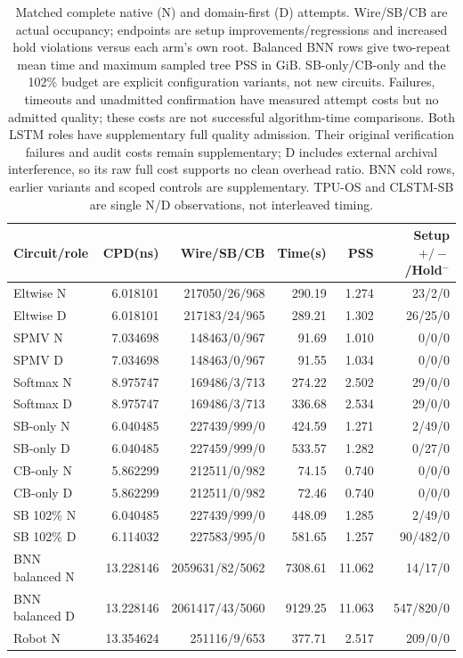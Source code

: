 \documentclass[conference,10pt]{IEEEtran}
\begin{document}
\begin{table}[t]
\centering\footnotesize\setlength{\tabcolsep}{3pt}
\caption{Matched complete native (N) and domain-first (D) attempts. Wire/SB/CB are actual occupancy; endpoints are setup improvements/regressions and increased hold violations versus each arm's own root. Balanced BNN rows give two-repeat mean time and maximum sampled tree PSS in GiB. SB-only/CB-only and the 102\% budget are explicit configuration variants, not new circuits. Failures, timeouts and unadmitted confirmation have measured attempt costs but no admitted quality; these costs are not successful algorithm-time comparisons. Both LSTM roles have supplementary full quality admission. Their original verification failures and audit costs remain supplementary; D includes external archival interference, so its raw full cost supports no clean overhead ratio. BNN cold rows, earlier variants and scoped controls are supplementary. TPU-OS and CLSTM-SB are single N/D observations, not interleaved timing.}
\label{tab:completecost}
\begin{tabular}{lrrrrr}\hline
Circuit/role & CPD(ns) & Wire/SB/CB & Time(s) & PSS & Setup $+/-$/Hold$^-$\\\hline
Eltwise N&6.018101&217050/26/968&290.19&1.274&23/2/0\\
Eltwise D&6.018101&217183/24/965&289.21&1.302&26/25/0\\
SPMV N&7.034698&148463/0/967&91.69&1.010&0/0/0\\
SPMV D&7.034698&148463/0/967&91.55&1.034&0/0/0\\
Softmax N&8.975747&169486/3/713&274.22&2.502&29/0/0\\
Softmax D&8.975747&169486/3/713&336.68&2.534&29/0/0\\
SB-only N&6.040485&227439/999/0&424.59&1.271&2/49/0\\
SB-only D&6.040485&227459/999/0&533.57&1.282&0/27/0\\
CB-only N&5.862299&212511/0/982&74.15&0.740&0/0/0\\
CB-only D&5.862299&212511/0/982&72.46&0.740&0/0/0\\
SB 102\% N&6.040485&227439/999/0&448.09&1.285&2/49/0\\
SB 102\% D&6.114032&227583/995/0&581.65&1.257&90/482/0\\
BNN balanced N&13.228146&2059631/82/5062&7308.61&11.062&14/17/0\\
BNN balanced D&13.228146&2061417/43/5060&9129.25&11.063&547/820/0\\
Robot N&13.354624&251116/9/653&377.71&2.517&209/0/0\\

\end{tabular}
\end{table}
\end{document}
